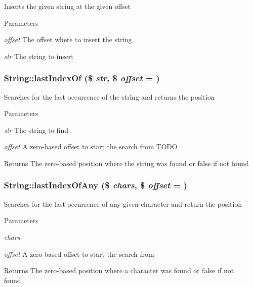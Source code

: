 \label{classString_abe7d7e1e2b57ab7dcd01d8e2d1d53148}
Inserts the given string at the given offset 
\begin{DoxyParams}{Parameters}
\item[{\em offset}]The offset where to insert the string \item[{\em str}]The string to insert \end{DoxyParams}
\hypertarget{classString_a18806fe790375032e3fb268f649914d7}{
\subsubsection[{lastIndexOf}]{\setlength{\rightskip}{0pt plus 5cm}String::lastIndexOf (\$ {\em str}, \/  \$ {\em offset} = {})}}
\label{classString_a18806fe790375032e3fb268f649914d7}
Searches for the last occurrence of the string and returns the position 
\begin{DoxyParams}{Parameters}
\item[{\em str}]The string to find \item[{\em offset}]A zero-\/based offset to start the search from TODO \end{DoxyParams}
\begin{DoxyReturn}{Returns}
The zero-\/based position where the string was found or false if not found 
\end{DoxyReturn}
\hypertarget{classString_adbe9cb0e51c46bd16881923a7a3d2e4a}{
\subsubsection[{lastIndexOfAny}]{\setlength{\rightskip}{0pt plus 5cm}String::lastIndexOfAny (\$ {\em chars}, \/  \$ {\em offset} = {})}}
\label{classString_adbe9cb0e51c46bd16881923a7a3d2e4a}
Searches for the last occurrence of any given character and return the position 
\begin{DoxyParams}{Parameters}
\item[{\em chars}]\item[{\em offset}]A zero-\/based offset to start the search from \end{DoxyParams}
\begin{DoxyReturn}{Returns}
The zero-\/based position where a character was found or false if not found 
\end{DoxyReturn}
